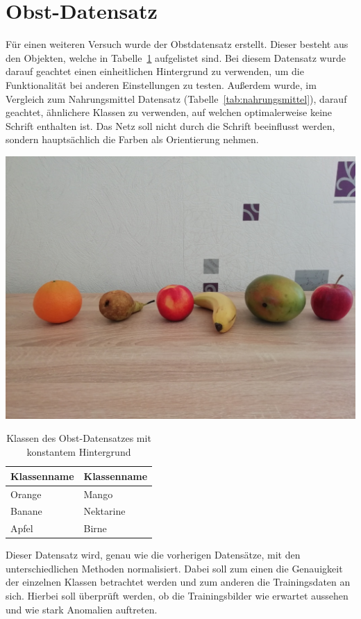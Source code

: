 \section{Obst-Datensatz}
Für einen weiteren Versuch wurde der Obstdatensatz erstellt. Dieser besteht aus den Objekten, welche in Tabelle~\ref{tab:obst} aufgelistet sind. Bei diesem Datensatz wurde darauf geachtet einen einheitlichen Hintergrund zu verwenden, um die Funktionalität bei anderen Einstellungen zu testen. Außerdem wurde, im Vergleich zum Nahrungsmittel Datensatz (Tabelle~\ref{tab:nahrungsmittel}), darauf geachtet, ähnlichere Klassen zu verwenden, auf welchen optimalerweise keine Schrift enthalten ist. Das Netz soll nicht durch die Schrift beeinflusst werden, sondern hauptsächlich die Farben als Orientierung nehmen.
\begin{table}[htb]
\caption{Klassen des Obst-Datensatzes mit konstantem Hintergrund}
\center
\begin{minipage}[c]{.4\textwidth} 
\includegraphics[width=.8\textwidth]{Sources/Obst_mit_hintergrund}  
\end{minipage} 
\begin{minipage}[c]{.4\textwidth}\label{tab:obst}   
\begin{tabular}{|l|l|}
\hline
Klassenname & Klassenname\\
\hline
Orange & Mango\\
Banane & Nektarine\\
Apfel & Birne\\
\hline
\end{tabular} 
\end{minipage}
\end{table}  
Dieser Datensatz wird, genau wie die vorherigen Datensätze, mit den unterschiedlichen Methoden normalisiert. Dabei soll zum einen die Genauigkeit der einzelnen Klassen betrachtet werden und zum anderen die Trainingsdaten an sich. Hierbei soll überprüft werden, ob die Trainingsbilder wie erwartet aussehen und wie stark Anomalien auftreten. 

